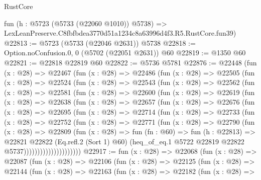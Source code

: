 \begin{lexlean}{RustCore}
\begin{coremodule}
    fun (h : @5723 (@5733 (@22060 @1010)) @5738) =>
    LexLeanPreserve.C8fbfbdea3770d51a1234c8a63996d4f3.R5.RustCore.fun39)
@22813 := @5723 (@5733 (@22046 @2631)) @5738
@22818 := Option.noConfusion.{0, 0} (@5702 (@22051 @2631)) @60
@22819 := @1350 @60
@22821 := @22818 @22819 @60
@22822 := @5736 @5781
@22876 := @22448
    (fun (x : @28) =>
    @22467
      (fun (x : @28) =>
      @22486
        (fun (x : @28) =>
        @22505
          (fun (x : @28) =>
          @22524
            (fun (x : @28) =>
            @22543
              (fun (x : @28) =>
              @22562
                (fun (x : @28) =>
                @22581
                  (fun (x : @28) =>
                  @22600
                    (fun (x : @28) =>
                    @22619
                      (fun (x : @28) =>
                      @22638
                        (fun (x : @28) =>
                        @22657
                          (fun (x : @28) =>
                          @22676
                            (fun (x : @28) =>
                            @22695
                              (fun (x : @28) =>
                              @22714
                                (fun (x : @28) =>
                                @22733
                                  (fun (x : @28) =>
                                  @22752
                                    (fun (x : @28) =>
                                    @22771
                                      (fun (x : @28) =>
                                      @22790
                                        (fun (x : @28) =>
                                        @22809
                                          (fun (x : @28) =>
                                          fun (fn : @60) =>
                                          fun (h : @22813) =>
                                          @22821
                                            @22822
                                            (Eq.refl.{2} (Sort 1) @60)
                                            (heq_of_eq.{1}
                                              @5722
                                              @22819
                                              @22822
                                              @5737)))))))))))))))))))))
@22917 := fun (x : @28) =>
  @22068
    (fun (x : @28) =>
    @22087
      (fun (x : @28) =>
      @22106
        (fun (x : @28) =>
        @22125
          (fun (x : @28) =>
          @22144
            (fun (x : @28) =>
            @22163
              (fun (x : @28) =>
              @22182
                (fun (x : @28) =>

\end{coremodule}
\end{lexlean}
